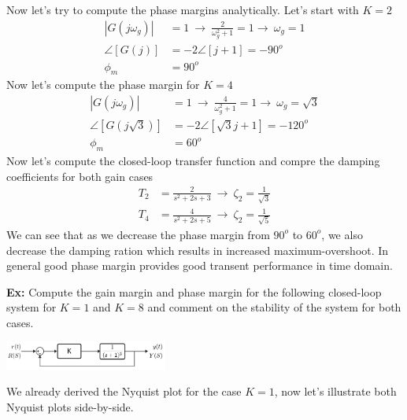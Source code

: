 \documentclass[twoside]{article}
\begin{document}
Now let's try to compute the phase margins analytically.
Let's start with $K = 2$
%
\begin{align*}
  | G(j \omega_g) | &= 1 \ \rightarrow \  
                      \frac{2}{ \omega_g^2 + 1 }  = 1
  \rightarrow \ \omega_g = 1 
  \\
  \angle [ G(j) ] &= - 2 \angle [ j + 1 ] = -90^o 
  \\
 \phi_m &= 90^o  
\end{align*}
%
Now let's compute the phase margin for $K = 4$
%
\begin{align*}
  | G(j \omega_g) | &= 1 \ \rightarrow \  
                      \frac{4}{ \omega_g^2 + 1 }  = 1
  \rightarrow \ \omega_g = \sqrt{3}
  \\
  \angle [ G(j \sqrt{3}) ] &= - 2 \angle [ \sqrt{3} j + 1 ] = -120^o 
  \\
 \phi_m &= 60^o  
\end{align*}
%
Now let's compute the closed-loop transfer function
and compre the damping coefficients for both gain cases
%
\begin{align*}
  T_2 &= \frac{2}{s^2 + 2 s + 3} \ \rightarrow \ \zeta_2 = \frac{1}{\sqrt{3}}
        \\
  T_4 &= \frac{4}{s^2 + 2 s + 5} \ \rightarrow \ \zeta_2 = \frac{1}{\sqrt{5}}
\end{align*}
%
We can see that as we decrease the phase margin from $90^o$ to $60^o$,
we also decrease the damping ration which results in increased maximum-overshoot.
In general good phase margin provides good transent performance in time domain. 

\vspace{6pt}

\textbf{Ex:} Compute the gain margin and phase margin 
for the following closed-loop system for $K = 1$ and $K = 8$
and comment on the stability of the system for both cases. 

\begin{center}
\begin{minipage}[h]{\linewidth}
    \begin{center}
      \includegraphics[width=0.4\textwidth]{ex3block}
    \end{center}
\end{minipage}
\end{center}

We already derived the Nyquist plot for the case $K = 1$,
now let's illustrate both Nyquist plots side-by-side.
\end{document}
